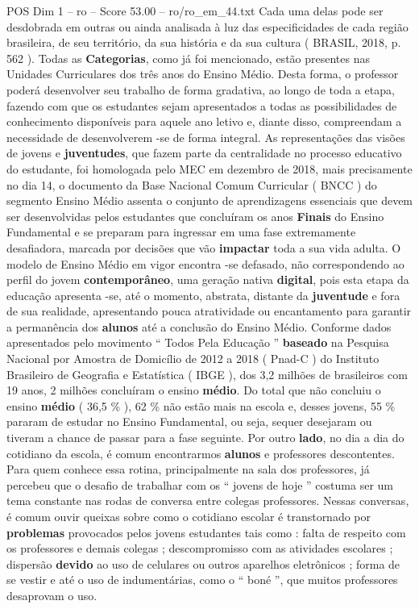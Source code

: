 \begin{textsample}{POS Dim 1 – ro – Score 53.00 – ro/ro\_em\_44.txt}
Cada uma delas pode ser desdobrada em outras ou ainda analisada à luz das especificidades de cada região brasileira, de seu território, da sua história e da sua cultura ( BRASIL, 2018, p. 562 ).
Todas as \textbf{Categorias}, como já foi mencionado, estão presentes nas Unidades Curriculares dos três anos do Ensino Médio.
Desta forma, o professor poderá desenvolver seu trabalho de forma gradativa, ao longo de toda a etapa, fazendo com que os estudantes sejam apresentados a todas as possibilidades de conhecimento disponíveis para aquele ano letivo e, diante disso, compreendam a necessidade de desenvolverem -se de forma integral.
As representações das visões de jovens e \textbf{juventudes}, que fazem parte da centralidade no processo educativo do estudante, foi homologada pelo MEC em dezembro de 2018, mais precisamente no dia 14, o documento da Base Nacional Comum Curricular ( BNCC ) do segmento Ensino Médio assenta o conjunto de aprendizagens essenciais que devem ser desenvolvidas pelos estudantes que concluíram os anos \textbf{Finais} do Ensino Fundamental e se preparam para ingressar em uma fase extremamente desafiadora, marcada por decisões que vão \textbf{impactar} toda a sua vida adulta.
O modelo de Ensino Médio em vigor encontra -se defasado, não correspondendo ao perfil do jovem \textbf{contemporâneo}, uma geração nativa \textbf{digital}, pois esta etapa da educação apresenta -se, até o momento, abstrata, distante da \textbf{juventude} e fora de sua realidade, apresentando pouca atratividade ou encantamento para garantir a permanência dos \textbf{alunos} até a conclusão do Ensino Médio.
Conforme dados apresentados pelo movimento “ Todos Pela Educação ” \textbf{baseado} na Pesquisa Nacional por Amostra de Domicílio de 2012 a 2018 ( Pnad-C ) do Instituto Brasileiro de Geografia e Estatística ( IBGE ), dos 3,2 milhões de brasileiros com 19 anos, 2 milhões concluíram o ensino \textbf{médio}.
Do total que não concluiu o ensino \textbf{médio} ( 36,5 \% ), 62 \% não estão mais na escola e, desses jovens, 55 \% pararam de estudar no Ensino Fundamental, ou seja, sequer desejaram ou tiveram a chance de passar para a fase seguinte.
Por outro \textbf{lado}, no dia a dia do cotidiano da escola, é comum encontrarmos \textbf{alunos} e professores descontentes.
Para quem conhece essa rotina, principalmente na sala dos professores, já percebeu que o desafio de trabalhar com os “ jovens de hoje ” costuma ser um tema constante nas rodas de conversa entre colegas professores.
Nessas conversas, é comum ouvir queixas sobre como o cotidiano escolar é transtornado por \textbf{problemas} provocados pelos jovens estudantes tais como : falta de respeito com os professores e demais colegas ; descompromisso com as atividades escolares ; dispersão \textbf{devido} ao uso de celulares ou outros aparelhos eletrônicos ; forma de se vestir e até o uso de indumentárias, como o “ boné ”, que muitos professores desaprovam o uso.

\end{textsample}
